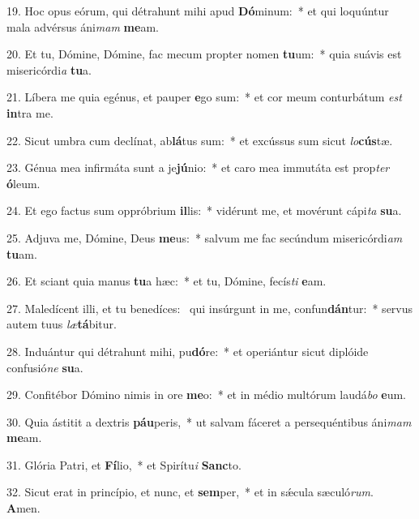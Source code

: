 19. Hoc opus eórum, qui détrahunt mihi apud \textbf{Dó}minum:~*  et qui loquúntur mala advérsus áni\textit{mam} \textbf{me}am.\

20. Et tu, Dómine, Dómine, fac mecum propter nomen \textbf{tu}um:~*  quia suávis est misericórdi\textit{a} \textbf{tu}a.\

21. Líbera me quia egénus, et pauper \textbf{e}go sum:~*  et cor meum conturbátum \textit{est} \textbf{in}tra me.\

22. Sicut umbra cum declínat, ab\textbf{lá}tus sum:~*  et excússus sum sicut \textit{lo}\textbf{cús}tæ.\

23. Génua mea infirmáta sunt a je\textbf{jú}nio:~*  et caro mea immutáta est prop\textit{ter} \textbf{ó}leum.\

24. Et ego factus sum oppróbrium \textbf{il}lis:~*  vidérunt me, et movérunt cápi\textit{ta} \textbf{su}a.\

25. Adjuva me, Dómine, Deus \textbf{me}us:~*  salvum me fac secúndum misericórdi\textit{am} \textbf{tu}am.\

26. Et sciant quia manus \textbf{tu}a hæc:~*  et tu, Dómine, fecís\textit{ti} \textbf{e}am.\

27. Maledícent illi, et tu benedíces: \dag\  qui insúrgunt in me, confun\textbf{dán}tur:~*  servus autem tuus \textit{læ}\textbf{tá}bitur.\

28. Induántur qui détrahunt mihi, pu\textbf{dó}re:~*  et operiántur sicut diplóide confusió\textit{ne} \textbf{su}a.\

29. Confitébor Dómino nimis in ore \textbf{me}o:~*  et in médio multórum laudá\textit{bo} \textbf{e}um.\

30. Quia ástitit a dextris \textbf{páu}peris,~*  ut salvam fáceret a persequéntibus áni\textit{mam} \textbf{me}am.\

31. Glória Patri, et \textbf{Fí}lio,~*  et Spirítu\textit{i} \textbf{Sanc}to.\

32. Sicut erat in princípio, et nunc, et \textbf{sem}per,~*  et in sǽcula sæculó\textit{rum}. \textbf{A}men.\

